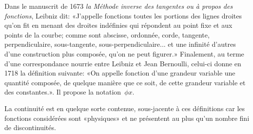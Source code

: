 \medskip
\begin{histoire}%
Dans le manuscrit de 1673 \emph{la Méthode inverse des tangentes ou à
propos des fonctions}, Leibniz dit:
 «J'appelle fonctions toutes les portions des lignes droites
qu'on fit en menant des droites indéfinies qui répondent au point fixe et aux points de la courbe;
comme sont abscisse, ordonnée, corde, tangente, perpendiculaire, sous-tangente, sous-perpendiculaire...
et une infinité d'autres d'une construction plus composée, qu'on ne peut figurer.»
Finalement, au terme d'une correspondance nourrie entre Leibniz
et Jean Bernoulli, celui-ci donne en 1718 la
définition suivante: «On appelle fonction d'une grandeur variable une quantité composée,
de quelque manière que ce soit, de cette grandeur variable et des constantes.».
Il propose la notation~$\phi x$.

La continuité est en quelque sorte contenue, sous-jacente à ces définitions car
les fonctions considérées sont «physiques» et ne présentent au plus qu'un nombre
fini de discontinuités.


\end{histoire}
